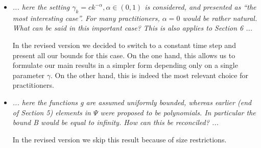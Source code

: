\documentclass{article}%
\begin{document}
\begin{itemize}
\item \textit{... here the setting \(\gamma_k = c k^{-\alpha}, \alpha\in  (0, 1)\) is considered, and presented as  ``the most interesting case''. For many practitioners, $\alpha=0$ would be rather natural. What can be said in this important case? This is also applies to Section 6 ...}
\par
In the revised version we decided to switch to a constant time step and present all our bounds for this case. On the one hand, this allows us to formulate our main results in a simpler form depending only on a single parameter $\gamma.$ On the other hand, this is indeed the most relevant choice for practitioners.  
\item \textit{ ... here the functions g are assumed uniformly bounded, whereas earlier (end of Section 5) elements in $\Psi$ were proposed to be polynomials. In particular the bound B would be equal to infinity. How can this be reconciled? ...}
\par
In the revised version we skip this result because of size restrictions. 
\end{itemize}
\end{document}
